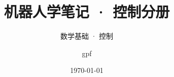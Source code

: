 
\usepackage{xr-hyper}


\title{机器人学笔记 · 控制分册}
\subtitle{数学基础 · 控制}
\author{gpf}\date{\today}


\maketitle
\frontmatter
\tableofcontents
\mainmatter


\backmatter
\nocite{*}
\printbibliography[heading=bibintoc, title={参考文献}]

